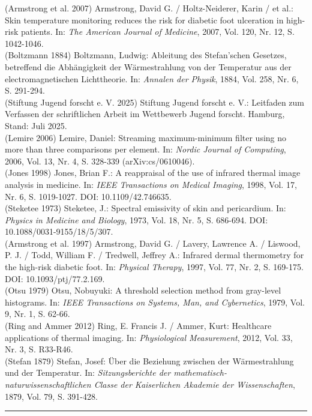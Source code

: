 \documentclass[
  11pt,
]{article}
\begin{document}
(Armstrong et al. 2007) Armstrong, David G. / Holtz-Neiderer, Karin / et
al.: Skin temperature monitoring reduces the risk for diabetic foot
ulceration in high-risk patients. In: \emph{The American Journal of
Medicine}, 2007, Vol. 120, Nr. 12, S. 1042-1046.\\
(Boltzmann 1884) Boltzmann, Ludwig: Ableitung des Stefan'schen Gesetzes,
betreffend die Abhängigkeit der Wärmestrahlung von der Temperatur aus
der electromagnetischen Lichttheorie. In: \emph{Annalen der Physik},
1884, Vol. 258, Nr. 6, S. 291-294.\\
(Stiftung Jugend forscht e. V. 2025) Stiftung Jugend forscht e. V.:
Leitfaden zum Verfassen der schriftlichen Arbeit im Wettbewerb Jugend
forscht. Hamburg, Stand: Juli 2025.\\
(Lemire 2006) Lemire, Daniel: Streaming maximum-minimum filter using no
more than three comparisons per element. In: \emph{Nordic Journal of
Computing}, 2006, Vol. 13, Nr. 4, S. 328-339 (arXiv:cs/0610046).\\
(Jones 1998) Jones, Brian F.: A reappraisal of the use of infrared
thermal image analysis in medicine. In: \emph{IEEE Transactions on
Medical Imaging}, 1998, Vol. 17, Nr. 6, S. 1019-1027. DOI:
10.1109/42.746635.\\
(Steketee 1973) Steketee, J.: Spectral emissivity of skin and
pericardium. In: \emph{Physics in Medicine and Biology}, 1973, Vol. 18,
Nr. 5, S. 686-694. DOI: 10.1088/0031-9155/18/5/307.\\
(Armstrong et al. 1997) Armstrong, David G. / Lavery, Lawrence A. /
Liswood, P. J. / Todd, William F. / Tredwell, Jeffrey A.: Infrared
dermal thermometry for the high-risk diabetic foot. In: \emph{Physical
Therapy}, 1997, Vol. 77, Nr. 2, S. 169-175. DOI: 10.1093/ptj/77.2.169.\\
(Otsu 1979) Otsu, Nobuyuki: A threshold selection method from gray-level
histograms. In: \emph{IEEE Transactions on Systems, Man, and
Cybernetics}, 1979, Vol. 9, Nr. 1, S. 62-66.\\
(Ring and Ammer 2012) Ring, E. Francis J. / Ammer, Kurt: Healthcare
applications of thermal imaging. In: \emph{Physiological Measurement},
2012, Vol. 33, Nr. 3, S. R33-R46.\\
(Stefan 1879) Stefan, Josef: Über die Beziehung zwischen der
Wärmestrahlung und der Temperatur. In: \emph{Sitzungsberichte der
mathematisch-naturwissenschaftlichen Classe der Kaiserlichen Akademie
der Wissenschaften}, 1879, Vol. 79, S. 391-428.

\begin{center}\rule{0.5\linewidth}{0.5pt}\end{center}
\end{document}
